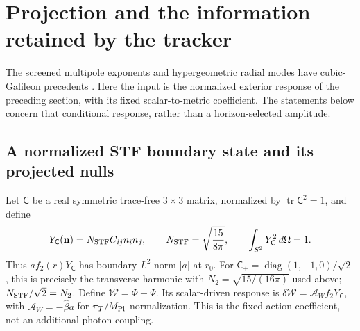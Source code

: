 \section{Projection and the information retained by the tracker}
\label{sec:projection-information}

The screened multipole exponents and hypergeometric radial modes have cubic-Galileon precedents \cite{Chu2013,Brito2014,Kobayashi2026}. Here the input is the normalized exterior response of the preceding section, with its fixed scalar-to-metric coefficient. The statements below concern that conditional response, rather than a horizon-selected amplitude.

\subsection{A normalized STF boundary state and its projected nulls}

Let $\mathsf C$ be a real symmetric trace-free $3\times3$ matrix, normalized by $\operatorname{tr}\mathsf C^2=1$, and define
\begin{equation}
 Y_{\mathsf C}(\mathbf n)=N_{\rm STF} C_{ij}n_i n_j,
 \qquad N_{\rm STF}=\sqrt{\frac{15}{8\pi}},\qquad
 \int_{S^2}Y_{\mathsf C}^2\,d\Omega=1.
\end{equation}
Thus $a f_2(r)Y_{\mathsf C}$ has boundary $L^2$ norm $|a|$ at $r_0$.
For $\mathsf C_+=\operatorname{diag}(1,-1,0)/\sqrt2$, this is precisely
the transverse harmonic with $N_2=\sqrt{15/(16\pi)}$ used above;
$N_{\rm STF}/\sqrt2=N_2$. Define $\mathcal W=\Phi+\Psi$.
Its scalar-driven response is $\delta\mathcal W=\mathcal A_W f_2Y_{\mathsf C}$,
with $\mathcal A_W=-\widehat\beta a$ for $\pi_T/M_{\rm Pl}$ normalization.
This is the fixed action coefficient, not an additional photon coupling.

